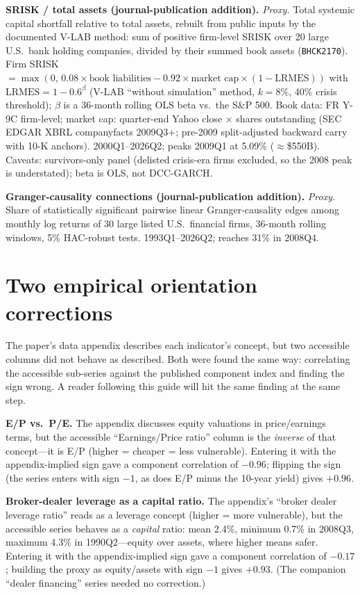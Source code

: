 \documentclass[11pt]{article}
\begin{document}
\textbf{SRISK / total assets (journal-publication addition).} \textit{Proxy.}
Total systemic capital shortfall relative to total assets, rebuilt from public
inputs by the documented V-LAB method: sum of positive firm-level SRISK over
20 large U.S.\ bank holding companies, divided by their summed book assets
(\texttt{BHCK2170}).  Firm SRISK $= \max(0,\, 0.08\times\text{book liabilities}
- 0.92\times\text{market cap}\times(1-\text{LRMES}))$ with
$\text{LRMES} = 1-0.6^{\beta}$ (V-LAB ``without simulation'' method,
$k=8\%$, 40\% crisis threshold); $\beta$ is a 36-month rolling OLS beta
vs.\ the S\&P 500.  Book data: FR Y-9C firm-level; market cap: quarter-end
Yahoo close $\times$ shares outstanding (SEC EDGAR XBRL companyfacts 2009Q3+;
pre-2009 split-adjusted backward carry with 10-K anchors).  2000Q1--2026Q2;
peaks 2009Q1 at 5.09\% ($\approx$\$550B).  Caveats: survivors-only panel
(delisted crisis-era firms excluded, so the 2008 peak is understated);
beta is OLS, not DCC-GARCH.

\textbf{Granger-causality connections (journal-publication addition).}
\textit{Proxy.}  Share of statistically significant pairwise linear
Granger-causality edges among monthly log returns of 30 large listed U.S.\
financial firms, 36-month rolling windows, 5\% HAC-robust tests.
1993Q1--2026Q2; reaches 31\% in 2008Q4.

\section{Two empirical orientation corrections}
\label{sec:corrections}

The paper's data appendix describes each indicator's concept, but two
accessible columns did not behave as described.  Both were found the same
way: correlating the accessible sub-series against the published component
index and finding the sign wrong.  A reader following this guide will hit
the same finding at the same step.

\textbf{E/P vs.\ P/E.} The appendix discusses equity valuations in
price/earnings terms, but the accessible ``Earnings/Price ratio'' column
is the \textit{inverse} of that concept---it is E/P (higher = cheaper =
less vulnerable).  Entering it with the appendix-implied sign gave a
component correlation of $-0.96$; flipping the sign (the series enters
with sign $-1$, as does E/P minus the 10-year yield) gives $+0.96$.

\textbf{Broker-dealer leverage as a capital ratio.} The appendix's
``broker dealer leverage ratio'' reads as a leverage concept (higher =
more vulnerable), but the accessible series behaves as a \textit{capital}
ratio: mean 2.4\%, minimum 0.7\% in 2008Q3, maximum 4.3\% in 1990Q2---equity
over assets, where higher means safer.  Entering it with the
appendix-implied sign gave a component correlation of $-0.17$; building
the proxy as equity/assets with sign $-1$ gives $+0.93$.  (The companion
``dealer financing'' series needed no correction.)
\end{document}
